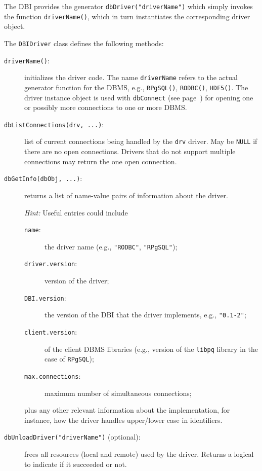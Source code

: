 \documentclass[graphics,times,psfig,dvips,hyper]{article}
\newcommand{\sfun}[1]{\mbox{\tt #1()}}  %
\newcommand{\sobj}[1]{\mbox{\tt #1}}    %
\newcommand{\sexp}[1]{\mbox{\tt #1}}    %
\newcommand{\sclass}[1]{\mbox{\tt #1}}  %
\newcommand{\smethod}[1]{\mbox{\tt #1}} %
\begin{document}
The DBI provides the generator \sexp{dbDriver("driverName")} 
which simply invokes the function \sfun{driverName}, which
in turn instantiates the corresponding driver object.

The \sclass{DBIDriver} class defines the following methods:
\begin{description}

\item[\sfun{driverName}:]\label{meth:driverName}
  initializes the driver code. The name \sobj{driverName} refers to
  the actual generator function for the DBMS, e.g., \sfun{RPgSQL},
  \sfun{RODBC}, \sfun{HDF5}.  The driver instance object is used
  with \smethod{dbConnect} (see page~\pageref{meth:dbConnect})
  for opening one or possibly more connections to one or more DBMS.

\item[\smethod{dbListConnections(drv, ...)}:]
  list of current connections being handled by the \sobj{drv}
  driver.  May be \sobj{NULL} if there are no open connections.
  Drivers that do not support multiple connections may return the
  one open connection.

\item[\smethod{dbGetInfo(dbObj, ...)}:]
  returns a list of name-value pairs of information about the
  driver.  

  \emph{Hint:} Useful entries could include 
  \begin{description}
  \item[\sobj{name}:] the driver name (e.g., \sexp{"RODBC"}, \sexp{"RPgSQL"}); 
  \item[\sobj{driver.version}:] version of the driver;
  \item[\sobj{DBI.version}:] the version of the DBI that the driver 
   implements, e.g., \sexp{"0.1-2"};
  \item[\sobj{client.version}:] of the client DBMS libraries (e.g., version
  of the \texttt{libpq} library in the case of \sobj{RPgSQL});
  \item[\sobj{max.connections}:] maximum number of simultaneous 
  connections; 
  \end{description}
  plus any other relevant information about the implementation, for instance, 
  how the driver handles upper/lower case in identifiers.

\item[\smethod{dbUnloadDriver("driverName")} (optional):]
  frees all resources (local and remote) used by the driver.  
  Returns a logical to indicate if it succeeded or not.
 
\end{description}
\end{document}
